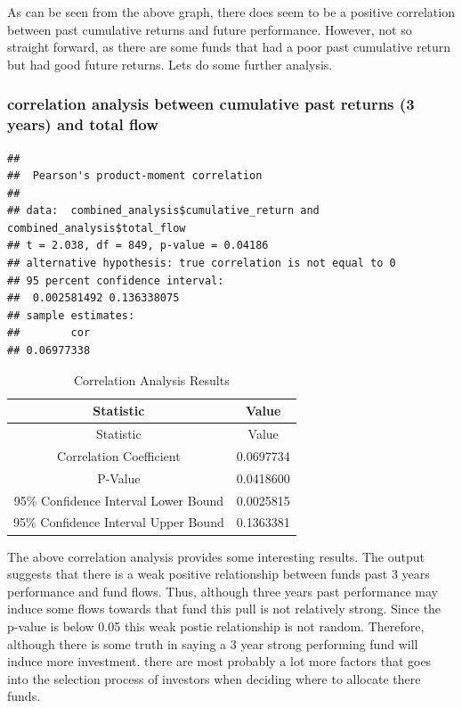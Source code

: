 \documentclass[11pt,preprint, authoryear]{elsarticle}
\numberwithin{equation}{section}
\numberwithin{figure}{section}
\numberwithin{table}{section}
\begin{document}
As can be seen from the above graph, there does seem to be a positive
correlation between past cumulative returns and future performance.
However, not so straight forward, as there are some funds that had a
poor past cumulative return but had good future returns. Lets do some
further analysis.

\hypertarget{correlation-analysis-between-cumulative-past-returns-3-years-and-total-flow}{%
\subsubsection{correlation analysis between cumulative past returns (3
years) and total
flow}\label{correlation-analysis-between-cumulative-past-returns-3-years-and-total-flow}}

\begin{verbatim}
## 
##  Pearson's product-moment correlation
## 
## data:  combined_analysis$cumulative_return and combined_analysis$total_flow
## t = 2.038, df = 849, p-value = 0.04186
## alternative hypothesis: true correlation is not equal to 0
## 95 percent confidence interval:
##  0.002581492 0.136338075
## sample estimates:
##        cor 
## 0.06977338
\end{verbatim}

\begin{longtable}[]{@{}cc@{}}
\caption{Correlation Analysis Results}\tabularnewline
\toprule\noalign{}
Statistic & Value \\
\midrule\noalign{}
\endfirsthead
\toprule\noalign{}
Statistic & Value \\
\midrule\noalign{}
\endhead
\bottomrule\noalign{}
\endlastfoot
Correlation Coefficient & 0.0697734 \\
P-Value & 0.0418600 \\
95\% Confidence Interval Lower Bound & 0.0025815 \\
95\% Confidence Interval Upper Bound & 0.1363381 \\
\end{longtable}

The above correlation analysis provides some interesting results. The
output suggests that there is a weak positive relationship between funds
past 3 years performance and fund flows. Thus, although three years past
performance may induce some flows towards that fund this pull is not
relatively strong. Since the p-value is below 0.05 this weak postie
relationship is not random. Therefore, although there is some truth in
saying a 3 year strong performing fund will induce more investment.
there are most probably a lot more factors that goes into the selection
process of investors when deciding where to allocate there funds.
\end{document}
